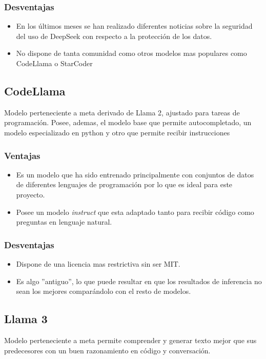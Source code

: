 \subsubsection{Desventajas}
\begin{itemize}
	\item En los últimos meses se han realizado diferentes noticias sobre la seguridad del uso de DeepSeek con respecto a la protección de los datos.
    \item No dispone de tanta comunidad como otros modelos mas populares como CodeLlama o StarCoder
\end{itemize}

\subsection{CodeLlama}
Modelo perteneciente a meta derivado de Llama 2, ajustado para tareas de programación. Posee, ademas, el modelo base que permite autocompletado, un modelo especializado en python y otro que permite recibir instrucciones

\subsubsection{Ventajas}
\begin{itemize}
	\item Es un modelo que ha sido entrenado principalmente con conjuntos de datos de diferentes lenguajes de programación por lo que es ideal para este proyecto.
    \item Posee un modelo \textit{instruct} que esta adaptado tanto para recibir código como preguntas en lenguaje natural.
\end{itemize}
\subsubsection{Desventajas}
\begin{itemize}
    \item Dispone de una licencia mas restrictiva sin ser MIT.
    \item Es algo ''antiguo'', lo que puede resultar en que los resultados de inferencia no sean los mejores comparándolo con el resto de modelos.
\end{itemize}
\subsection{Llama 3}
Modelo perteneciente a meta permite comprender y generar texto mejor que sus predecesores con un buen razonamiento en código y conversación.
